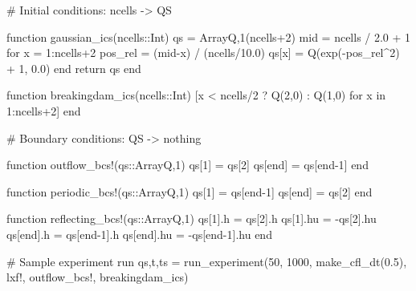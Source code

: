 \begin{myjulia}
# Initial conditions: ncells -> QS

function gaussian_ics(ncells::Int)
    qs = Array{Q,1}(ncells+2)
    mid = ncells / 2.0 + 1
    for x = 1:ncells+2
        pos_rel = (mid-x) / (ncells/10.0)
        qs[x] = Q(exp(-pos_rel^2) + 1, 0.0)
    end
    return qs
end

function breakingdam_ics(ncells::Int)
    [x < ncells/2 ? Q(2,0) : Q(1,0) for x in 1:ncells+2]
end
\end{myjulia}

\begin{myjulia}
# Boundary conditions: QS -> nothing 

function outflow_bcs!(qs::Array{Q,1})
    qs[1] = qs[2]
    qs[end] = qs[end-1]
end

function periodic_bcs!(qs::Array{Q,1})
    qs[1] = qs[end-1]
    qs[end] = qs[2]
end

function reflecting_bcs!(qs::Array{Q,1})
    qs[1].h = qs[2].h
    qs[1].hu = -qs[2].hu
    qs[end].h = qs[end-1].h
    qs[end].hu = -qs[end-1].hu
end
\end{myjulia}

\begin{myjulia}

# Sample experiment run
qs,t,ts = run_experiment(50, 1000, make_cfl_dt(0.5), 
              lxf!, outflow_bcs!, breakingdam_ics)

\end{myjulia}
